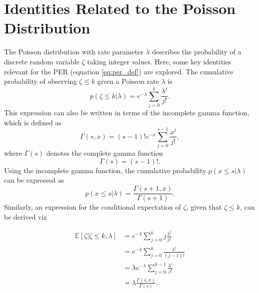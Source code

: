\section{Identities Related to the Poisson Distribution}
\label{sec:poisson_identities}
The Poisson distribution with rate parameter $\lambda$ describes the probability of a discrete random variable $\zeta$ taking integer values. Here, some key identities relevant for the PER (equation \eqref{eq:per_def}) are explored. The cumulative probability of observing $\zeta \leq k$ given a Poisson rate $\lambda$ is
\begin{equation}
	p(\zeta \leq k | \lambda) = e^{-\lambda} \sum_{j=0}^k \frac{\lambda^j}{j!}.
\end{equation}
This expression can also be written in terms of the incomplete gamma function, which is defined as
\begin{equation}
	\Gamma(s, x) = (s-1)! e^{-x} \sum_{j=0}^{s-1} \frac{x^j}{j!},
\end{equation}
where $\Gamma(s)$ denotes the complete gamma function
\begin{equation}
	\Gamma(s) = (s-1)!.
\end{equation}
Using the incomplete gamma function, the cumulative probability $p(x \leq s | \lambda)$ can be expressed as
\begin{equation}
	p(x \leq s | \lambda) = \frac{\Gamma(s+1, x)}{\Gamma(s+1)}.
\end{equation}
Similarly, an expression for the conditional expectation of $\zeta$, given that $\zeta \leq k$, can be derived viz

\begin{equation}
	\begin{split}
		\mathbb{E}[\zeta | \zeta \leq k, \lambda] &= e^{-\lambda} \sum_{j=0}^k j \frac{\lambda^j}{j!} \\
		&= e^{-\lambda} \sum_{j=0}^{k} \frac{\lambda^{j}}{(j-1)!} \\
		&= \lambda e^{-\lambda} \sum_{j=0}^{k-1} \frac{\lambda^{j}}{j!} \\
		&= \lambda \frac{\Gamma(s, x)}{\Gamma(s)}.
	\end{split}
\end{equation}
